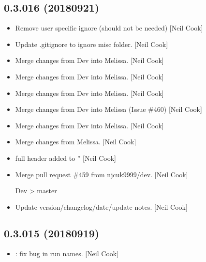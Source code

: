 \documentclass[a4paper,10pt,english]{report}
\begin{document}
\subsection{0.3.016 (2018\sphinxhyphen{}09\sphinxhyphen{}21)}
\label{\detokenize{misc/changelog:id334}}\begin{itemize}
\item {} 
Remove user specific ignore (should not be needed) {[}Neil Cook{]}

\item {} 
Update .gitignore to ignore misc folder. {[}Neil Cook{]}

\item {} 
 \sphinxhyphen{} Merge changes from Dev into Melissa. {[}Neil Cook{]}

\item {} 
 \sphinxhyphen{} Merge changes from Dev into Melissa. {[}Neil Cook{]}

\item {} 
 \sphinxhyphen{} Merge changes from Dev into Melissa. {[}Neil Cook{]}

\item {} 
 \sphinxhyphen{} Merge changes from Dev into Melissa (Issue \#460) {[}Neil
Cook{]}

\item {} 
 \sphinxhyphen{} Merge changes from Dev into Melissa. {[}Neil
Cook{]}

\item {} 
 \sphinxhyphen{} Merge changes from Melissa. {[}Neil Cook{]}

\item {} 
 \sphinxhyphen{} full header added to ” {[}Neil
Cook{]}

\item {} 
Merge pull request \#459 from njcuk9999/dev. {[}Neil Cook{]}

Dev \textendash{}\textgreater{} master

\item {} 
Update version/changelog/date/update notes. {[}Neil Cook{]}

\end{itemize}


\subsection{0.3.015 (2018\sphinxhyphen{}09\sphinxhyphen{}19)}
\label{\detokenize{misc/changelog:id335}}\begin{itemize}
\item {} 
: fix bug in run names. {[}Neil Cook{]}

\end{itemize}
\end{document}
